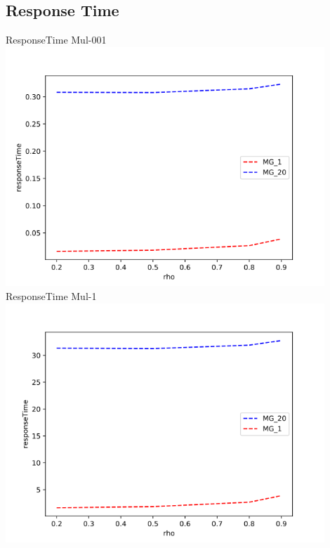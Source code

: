 \documentclass[a4paper]{article}
\begin{document}
\begin{center}
\section*{Response Time}
ResponseTime Mul-001 \\
\includegraphics[width=0.9\textwidth]{responseTime-Mul_001.png}
ResponseTime Mul-1 \\
\includegraphics[width=0.9\textwidth]{responseTime-Mul_1.png}
\end{center}
\end{document}
